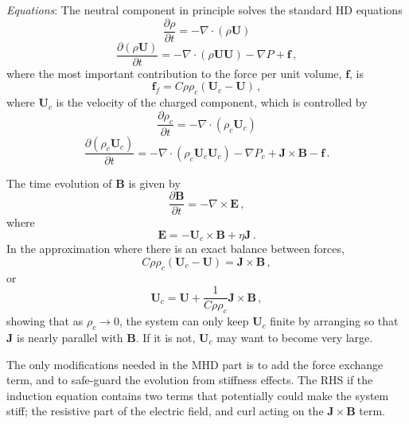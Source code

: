 \documentclass[paper=a4,fontsize=11pt]{scrartcl}
\numberwithin{equation}{section}		%
\numberwithin{figure}{section}			%
\numberwithin{table}{section}				%
\begin{document}
\textit{Equations}: The neutral component in principle solves the standard HD equations
\def\UU{\mathbf{U}}
\def\JJ{\mathbf{J}}
\def\BB{\mathbf{B}}
\def\EE{\mathbf{E}}
\def\uu{\mathbf{u}}
\def\ff{\mathbf{f}}
\begin{equation}
   \frac{\partial \rho}{\partial t}  = -\nabla \cdot (\rho \UU)    
\end{equation}
\begin{equation}
   \frac{\partial (\rho\UU)}{\partial t}  = -\nabla \cdot (\rho \UU\UU) - \nabla P + \ff \,,
\end{equation}
where the most important contribution to the force per unit volume, $\ff$, is
\begin{equation}
   \ff_f  = C\rho\rho_c(\UU_c-\UU) \,,
\end{equation}
where $\UU_c$ is the velocity of the charged component, which is controlled by
\begin{equation}
   \frac{\partial \rho_c}{\partial t}  = -\nabla \cdot (\rho_c \UU_c)    
\end{equation}
\begin{equation}
   \frac{\partial (\rho_c\UU_c)}{\partial t}  = -\nabla \cdot (\rho_c \UU_c\UU_c) - \nabla P_c + \JJ\times\BB -\ff \,.
\end{equation}

The time evolution of $\BB$ is given by
\begin{equation}
    \frac{\partial \BB}{\partial t} = - \nabla\times\EE \,,
\end{equation}
where
\begin{equation}
    \EE = -\UU_c \times \BB + \eta \JJ \,.
\end{equation}
In the approximation where there is an exact balance between forces,
\begin{equation}
    C\rho\rho_c(\UU_c-\UU) = \JJ\times\BB \,,
\end{equation}
or
\begin{equation}
    \UU_c = \UU + \frac{1}{C\rho\rho_c}\JJ\times\BB \,,
\end{equation}
showing that as $\rho_c \rightarrow 0$, the system can only keep $\UU_c$ finite by arranging so that $\JJ$ is nearly parallel with $\BB$.  If it is not, $\UU_c$ may want to become very large.

The only modifications needed in the MHD part is to add the force exchange term, and to safe-guard the evolution from stiffness effects.  The RHS if the induction equation contains two terms that potentially could make the system stiff; the resistive part of the electric field, and curl acting on the $\JJ\times\BB$ term.  
\end{document}
